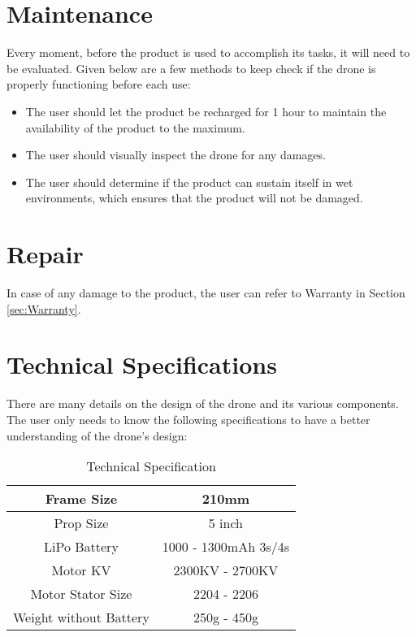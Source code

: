\documentclass[12pt]{article}
\begin{document}
\section{Maintenance}

Every moment, before the product is used to accomplish its tasks, it will need to be evaluated. Given below are a few methods to keep check if the drone is properly functioning before each use:

\begin{itemize}
    \item The user should let the product be recharged for 1 hour to maintain the availability of the product to the maximum.
    \item The user should visually inspect the drone for any damages.
    \item The user should determine if the product can sustain itself in wet environments, which ensures that the product will not be damaged.
\end{itemize}

\section{Repair}

In case of any damage to the product, the user can refer to Warranty in Section \ref{sec:Warranty}.

\section{Technical Specifications}

There are many details on the design of the drone and its various components. The user only needs to know the following specifications to have a better understanding of the drone's design:

\begin{longtable}{| c | c |}
\caption {Technical Specification}
\label{tab:TechnicalSpecifications} \\
\hline
Frame Size & 210mm \\
\hline
Prop Size & 5 inch \\
\hline
LiPo Battery & 1000 - 1300mAh 3s/4s \\
\hline
Motor KV & 2300KV - 2700KV \\
\hline
Motor Stator Size & 2204 - 2206 \\
\hline
Weight without Battery & 250g - 450g \\
\hline
\end{longtable}
\end{document}
